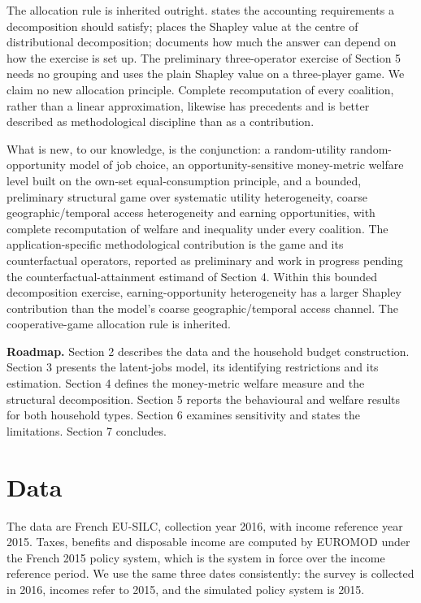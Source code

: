 \documentclass[11pt,a4paper]{article}
\begin{document}
The allocation rule is inherited outright. \citet{shorrocks1982} states the accounting requirements a decomposition should satisfy; \citet{shorrocks2013} places the Shapley value at the centre of distributional decomposition; \citet{sastretrannoy2002} documents how much the answer can depend on how the exercise is set up. The preliminary three-operator exercise of Section 5 needs no grouping and uses the plain Shapley value on a three-player game. We claim no new allocation principle. Complete recomputation of every coalition, rather than a linear approximation, likewise has precedents and is better described as methodological discipline than as a contribution.

What is new, to our knowledge, is the conjunction: a random-utility random-opportunity model of job choice, an opportunity-sensitive money-metric welfare level built on the own-set equal-consumption principle, and a bounded, preliminary structural game over systematic utility heterogeneity, coarse geographic/temporal access heterogeneity and earning opportunities, with complete recomputation of welfare and inequality under every coalition. The application-specific methodological contribution is the game and its counterfactual operators, reported as preliminary and work in progress pending the counterfactual-attainment estimand of Section 4. Within this bounded decomposition exercise, earning-opportunity heterogeneity has a larger Shapley contribution than the model's coarse geographic/temporal access channel. The cooperative-game allocation rule is inherited.

\textbf{Roadmap.} Section 2 describes the data and the household budget construction. Section 3 presents the latent-jobs model, its identifying restrictions and its estimation. Section 4 defines the money-metric welfare measure and the structural decomposition. Section 5 reports the behavioural and welfare results for both household types. Section 6 examines sensitivity and states the limitations. Section 7 concludes.

\section{Data}\label{data}

The data are French EU-SILC, collection year 2016, with income reference year 2015. Taxes, benefits and disposable income are computed by EUROMOD \citep{sutherlandfigari2013} under the French 2015 policy system, which is the system in force over the income reference period. We use the same three dates consistently: the survey is collected in 2016, incomes refer to 2015, and the simulated policy system is 2015.
\end{document}
